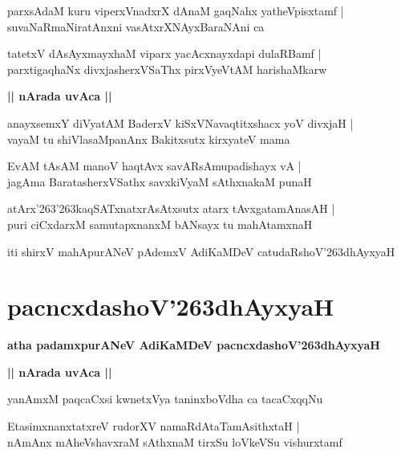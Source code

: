 \documentclass[twoside,12pt,openright]{book}
\def\S{\char'263}
\newcounter{shloka}[chapter]
\def\uvaca#1{\centerline{{\large\textbf{#1}}}}
\begin{document}
\begin{shloka}
parxsAdaM kuru viperxVnadxrX dAnaM gaqNahx yatheVpisxtamf |\\
suvaNaRmaNiratAnxni vasAtxrXNAyxBaraNAni ca
\end{shloka}

\begin{shloka}
tatetxV dAsAyxmayxhaM viparx yacAcxnayxdapi dulaRBamf |\\
parxtigaqhaNx divxjasherxVSaThx pirxVyeVtAM harishaMkarw
\end{shloka}

\uvaca{|| nArada uvAca ||}

\begin{shloka}
anayxsemxY diVyatAM BaderxV kiSxVNavaqtitxshacx yoV divxjaH |\\
vayaM tu shiVlasaMpanAnx Bakitxsutx kirxyateV mama
\end{shloka}

\begin{shloka}
EvAM tAsAM manoV haqtAvx savARsAmupadishayx vA |\\
jagAma BaratasherxVSathx savxkiVyaM sAthxnakaM punaH 
\end{shloka}

\begin{shloka}
atArx\S\S kaqSATxnatxrAsAtxsutx atarx tAvxgatamAnasAH |\\
puri ciCxdarxM samutapxnanxM bANsayx tu mahAtamxnaH 
\end{shloka}

\begin{center}
iti shirxV mahApurANeV pAdemxV AdiKaMDeV catudaRshoV\S dhAyxyaH
\end{center}

\chapter{pacncxdashoV\S dhAyxyaH}

\begin{center}
{\LARGE\bfseries atha padamxpurANeV AdiKaMDeV pacncxdashoV\S dhAyxyaH}
\end{center}

\uvaca{|| nArada uvAca ||}

\begin{shloka}
yanAmxM paqcaCxsi kwnetxVya taninxboVdha ca tacaCxqqNu 
\end{shloka}

\begin{shloka}
EtasimxnanxtatxreV rudorXV namaRdAtaTamAsithxtaH |\\
nAmAnx mAheVshavxraM sAthxnaM tirxSu loVkeVSu vishurxtamf
\end{shloka}
\end{document}
